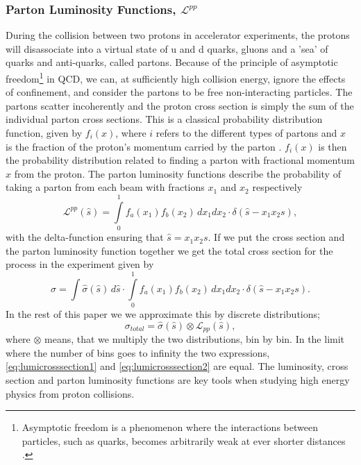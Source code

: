 \subsubsection{Parton Luminosity Functions, $\mathcal{L}^{pp}$}
During the collision between two protons in accelerator experiments, the protons will disassociate into a virtual state of u and d quarks, gluons and a 'sea' of quarks and anti-quarks, called partons. Because of the principle of asymptotic freedom\footnote{Asymptotic freedom is a phenomenon where the interactions between particles, such as quarks, becomes arbitrarily weak at ever shorter distances \cite{griffiths1987iep}.} in QCD, we can, at sufficiently high collision energy, ignore the effects of confinement, and consider the partons to be free non-interacting particles. The partons scatter incoherently and the proton cross section is simply the sum of the individual parton cross sections. This is a classical probability distribution function, given by $f_{i}(x)$, where $i$ refers to the different types of partons and $x$ is the fraction of the proton's momentum carried by the parton \cite{green2005hpp}. $f_{i}(x)$ is then the probability distribution related to finding a parton with fractional momentum $x$ from the proton. The parton luminosity functions describe the probability of taking a parton from each beam with fractions $x_{1}$ and $x_{2}$ respectively
\begin{equation}
\mathcal{L}^{pp}(\hat s)=\int\limits_{0}^{1} f_{a}(x_{1}) f_{b}(x_{2})\, dx_{1}dx_{2}\cdot \delta(\hat s - x_{1}x_{2}s),
\end{equation}
with the delta-function ensuring that $\hat s = x_{1}x_{2}s$. If we put the cross section and the parton luminosity function together we get the total cross section for the process in the experiment given by
\begin{equation} \label{eq:lumicrosssection1}
\sigma=\int \hat \sigma(\hat s) \, d \hat s \cdot \int\limits_{0}^{1} f_{a}(x_{1}) f_{b}(x_{2})\, dx_{1}dx_{2} \cdot \delta(\hat s - x_{1}x_{2}s).
\end{equation}
In the rest of this paper we we approximate this by discrete distributions;
\begin{equation} \label{eq:lumicrosssection2}
\sigma_{total}= \hat \sigma(\hat s) \otimes  \mathcal{L}_{pp}(\hat s),
\end{equation}
where $\otimes$ means, that we multiply the two distributions, bin by bin. In the limit where the number of bins goes to infinity the two expressions, \eqref{eq:lumicrosssection1} and \eqref{eq:lumicrosssection2} are equal. The luminosity, cross section and parton luminosity functions are key tools when studying high energy physics from proton collisions. %